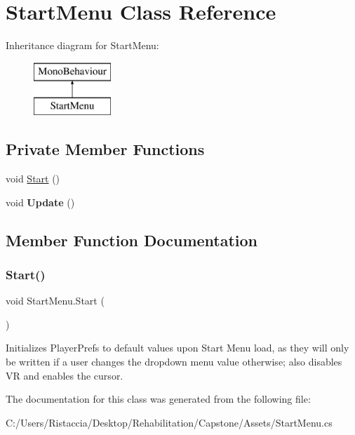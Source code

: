 \hypertarget{class_start_menu}{}\section{Start\+Menu Class Reference}
\label{class_start_menu}
Inheritance diagram for Start\+Menu\+:\begin{figure}[H]
\begin{center}
\leavevmode
\includegraphics[height=2.000000cm]{class_start_menu}
\end{center}
\end{figure}
\subsection*{Private Member Functions}
\begin{DoxyCompactItemize}
\item 
void \hyperlink{class_start_menu_a95770c1f46d99fb66b5ac8187eddc113}{Start} ()
\item 
\mbox{\label{class_start_menu_af6cb7e0fc2333c19140062f2c96fede4}} 
void {\bfseries Update} ()
\end{DoxyCompactItemize}


\subsection{Member Function Documentation}
\mbox{\label{class_start_menu_a95770c1f46d99fb66b5ac8187eddc113}} 
\subsubsection{\texorpdfstring{Start()}{Start()}}
{\footnotesize\ttfamily void Start\+Menu.\+Start (\begin{DoxyParamCaption}{ }\end{DoxyParamCaption})\hspace{0.3cm}{\ttfamily [private]}}

Initializes Player\+Prefs to default values upon Start Menu load, as they will only be written if a user changes the dropdown menu value otherwise; also disables VR and enables the cursor. 

The documentation for this class was generated from the following file\+:\begin{DoxyCompactItemize}
\item 
C\+:/\+Users/\+Ristaccia/\+Desktop/\+Rehabilitation/\+Capstone/\+Assets/Start\+Menu.\+cs\end{DoxyCompactItemize}
